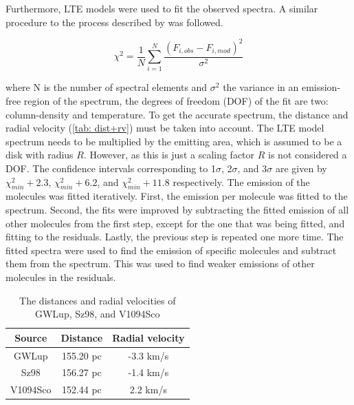 \documentclass[twoside, single, authoryear, semicolon, 12pt]{lion-msc}
\newcommand{\4}{$_4$}
\newcommand{\3}{$_3$}
\newcommand{\2}{$_2$}
\begin{document}
Furthermore, LTE models were used to fit the observed spectra. A similar procedure to the process described by \cite{Grant_2023} was followed. 

\begin{equation}
    \chi^2=\frac{1}{N}\sum_{i=1}^N\frac{(F_{i,obs}-F_{i, mod})^2}{\sigma^2}
\end{equation}

where N is the number of spectral elements and $\sigma^2$ the variance in an emission-free region of the spectrum, the degrees of freedom (DOF) of the fit are two: column-density and temperature. To get the accurate spectrum, the distance and radial velocity (\autoref{tab: dist+rv}) must be taken into account. The LTE model spectrum needs to be multiplied by the emitting area, which is assumed to be a disk with radius $R$. However, as this is just a scaling factor $R$ is not considered a DOF. The confidence intervals corresponding to 1$\sigma$, 2$\sigma$, and 3$\sigma$ are given by $\chi^2_{min}+2.3$, $\chi^2_{min}+6.2$, and $\chi^2_{min}+11.8$ respectively. The emission of the molecules was fitted iteratively. First, the emission per molecule was fitted to the spectrum. Second, the fits were improved by subtracting the fitted emission of all other molecules from the first step, except for the one that was being fitted, and fitting to the residuals. Lastly, the previous step is repeated one more time. 
The fitted spectra were used to find the emission of specific molecules and subtract them from the spectrum. This was used to find weaker emissions of other molecules in the residuals. 

\begin{table}[H]
\centering
\begin{tabular}{ccc}
\hline
Source   & \makecell{Distance \\\citep{henning2024mindsjwstmirimidinfrared}}  & \makecell{Radial velocity \\ \citep{Frasca_2017}} \\ \hline
GWLup    & 155.20 pc & -3.3 km/s       \\
Sz98     & 156.27 pc & -1.4 km/s       \\
V1094Sco & 152.44 pc & 2.2 km/s        \\ \hline
\end{tabular}
\caption{The distances and radial velocities of GWLup, Sz98, and V1094Sco}
\label{tab: dist+rv}
\end{table}
\end{document}
